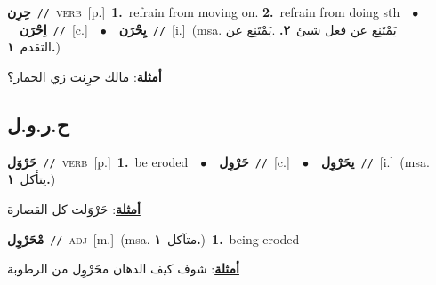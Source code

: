 \documentclass[10pt,a4paper,twoside]{article} %
\begin{document}
\begin{multicols}{2}
{\setlength\topsep{0pt}\textbf{\foreignlanguage{arabic}{حِرِن}}\ {\color{gray}\texttt{//}\color{black}}\ \textsc{verb}\ [p.]\ \textbf{1.}~refrain from moving on.  \textbf{2.}~refrain from doing sth\ \ $\bullet$\ \ \setlength\topsep{0pt}\textbf{\foreignlanguage{arabic}{اِحْرَن}}\ {\color{gray}\texttt{//}\color{black}}\ [c.]\ \ $\bullet$\ \ \setlength\topsep{0pt}\textbf{\foreignlanguage{arabic}{يِحْرَن}}\ {\color{gray}\texttt{//}\color{black}}\ [i.]\ \color{gray}(msa. \foreignlanguage{arabic}{يَمْتَنِع عن فعل شيئ}~\foreignlanguage{arabic}{\textbf{٢.}}  .\foreignlanguage{arabic}{يَمْتَنِع عن التقدم}~\foreignlanguage{arabic}{\textbf{١.}})\color{black}\  \begin{flushright}\color{gray}\foreignlanguage{arabic}{\textbf{\underline{\foreignlanguage{arabic}{أمثلة}}}: مالك حرِنت زي الحمار؟}\end{flushright}\color{black}} \vspace{2mm}

\vspace{-3mm}
\subsection*{\color{blue}\foreignlanguage{arabic}{ح.ر.و.ل}\color{blue}{}} 

{\setlength\topsep{0pt}\textbf{\foreignlanguage{arabic}{حَرْوَل}}\ {\color{gray}\texttt{//}\color{black}}\ \textsc{verb}\ [p.]\ \textbf{1.}~be eroded\ \ $\bullet$\ \ \setlength\topsep{0pt}\textbf{\foreignlanguage{arabic}{حَرْوِل}}\ {\color{gray}\texttt{//}\color{black}}\ [c.]\ \ $\bullet$\ \ \setlength\topsep{0pt}\textbf{\foreignlanguage{arabic}{يحَرْوِل}}\ {\color{gray}\texttt{//}\color{black}}\ [i.]\ \color{gray}(msa. \foreignlanguage{arabic}{يتأكل}~\foreignlanguage{arabic}{\textbf{١.}})\color{black}\  \begin{flushright}\color{gray}\foreignlanguage{arabic}{\textbf{\underline{\foreignlanguage{arabic}{أمثلة}}}: حَرْوَلت كل القصارة}\end{flushright}\color{black}} \vspace{2mm}

{\setlength\topsep{0pt}\textbf{\foreignlanguage{arabic}{مْحَرْوِل}}\ {\color{gray}\texttt{//}\color{black}}\ \textsc{adj}\ [m.]\ \color{gray}(msa. \foreignlanguage{arabic}{متآكل}~\foreignlanguage{arabic}{\textbf{١.}})\color{black}\ \textbf{1.}~being eroded\  \begin{flushright}\color{gray}\foreignlanguage{arabic}{\textbf{\underline{\foreignlanguage{arabic}{أمثلة}}}: شوف كيف الدهان محَرْوِل من الرطوبة}\end{flushright}\color{black}} \vspace{2mm}


\end{multicols}
\end{document}
